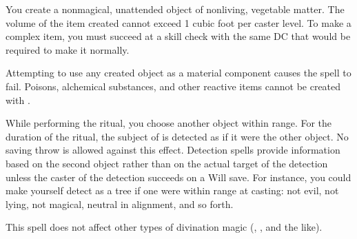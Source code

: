 \begin{spelleffect}
You create a nonmagical, unattended object of nonliving, vegetable matter. The volume of the item created cannot exceed 1 cubic foot per caster level. To make a complex item, you must succeed at a skill check with the same DC that would be required to make it normally.
\end{spelleffect}
\begin{spellnotes}
Attempting to use any created object as a material component causes the spell to fail. Poisons, alchemical substances, and other reactive items cannot be created with .
\end{spellnotes}

\begin{comment}
\spellsection{Mirage Arcana}
\spellschool{Illusion (Glamer)}
\spellskill{Arcana}
\spelllvl{Arcane 5}
\spelltime{1 standard action}
\spellarea{One 20 ft. cube/level (S)}
\spelldur{\durext (D)}
\begin{spelleffect}
This spell functions like \spell{hallucinatory terrain}, except that it enables you to make any area appear to be something other than it is. The illusion includes audible, visual, tactile, and olfactory elements. Unlike hallucinatory terrain, the spell can alter the appearance of structures (or add them where none are present). Still, it can't disguise, conceal, or add creatures (though creatures within the area might hide themselves within the illusion just as they can hide themselves within a real location).
\end{spelleffect}
\end{comment}

\spellrng{\rngclose}
\begin{spelleffect}
While performing the ritual, you choose another object within range. For the duration of the ritual, the subject of  is detected as if it were the other object. No saving throw is allowed against this effect. Detection spells provide information based on the second object rather than on the actual target of the detection unless the caster of the detection succeeds on a Will save. For instance, you could make yourself detect as a tree if one were within range at casting: not evil, not lying, not magical, neutral in alignment, and so forth.
\end{spelleffect}
\begin{spellnotes}
This spell does not affect other types of divination magic (, , and the like).
\end{spellnotes}

